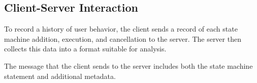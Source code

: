 \subsection{Client-Server Interaction}
\label{sec:server}

To record a history of user behavior,
the \toolname client sends a record of each state machine addition,
execution, and cancellation to the \toolname server.
The server then collects this data into a format suitable for analysis.

The message that the client sends to the server includes both the
state machine statement and additional metadata.

